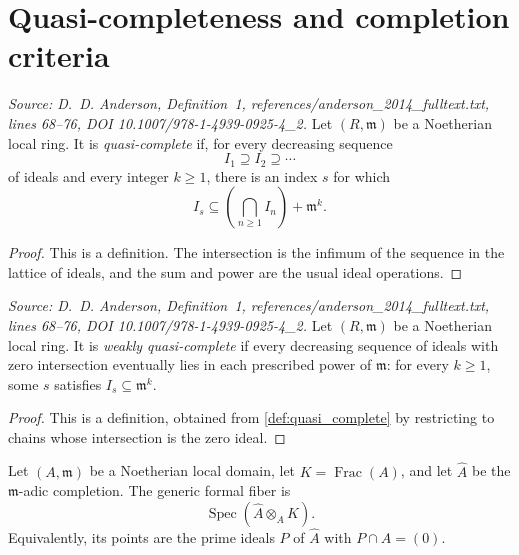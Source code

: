 \chapter{Quasi-completeness and completion criteria}

\begin{definition}
  \label{def:quasi_complete}
  \textit{Source: D.~D. Anderson, Definition~1,
  references/anderson\_2014\_fulltext.txt, lines 68--76,
  DOI 10.1007/978-1-4939-0925-4\_2.}
  Let \((R,\mathfrak m)\) be a Noetherian local ring.  It is
  \emph{quasi-complete} if, for every decreasing sequence
  \[
    I_1\supseteq I_2\supseteq\cdots
  \]
  of ideals and every integer \(k\geq 1\), there is an index \(s\) for which
  \[
    I_s\subseteq \left(\bigcap_{n\geq 1}I_n\right)+\mathfrak m^k.
  \]
\end{definition}

\begin{proof}
  This is a definition.  The intersection is the infimum of the sequence in
  the lattice of ideals, and the sum and power are the usual ideal operations.
\end{proof}

\begin{definition}
  \label{def:weakly_quasi_complete}
  \textit{Source: D.~D. Anderson, Definition~1,
  references/anderson\_2014\_fulltext.txt, lines 68--76,
  DOI 10.1007/978-1-4939-0925-4\_2.}
  Let \((R,\mathfrak m)\) be a Noetherian local ring.  It is \emph{weakly
  quasi-complete} if every decreasing sequence of ideals with zero
  intersection eventually lies in each prescribed power of \(\mathfrak m\):
  for every \(k\geq 1\), some \(s\) satisfies \(I_s\subseteq\mathfrak m^k\).
\end{definition}

\begin{proof}
  This is a definition, obtained from \cref{def:quasi_complete} by restricting
  to chains whose intersection is the zero ideal.
\end{proof}

\begin{definition}
  \label{def:generic_formal_fiber}
  Let \((A,\mathfrak m)\) be a Noetherian local domain, let
  \(K=\operatorname{Frac}(A)\), and let \(\widehat A\) be the
  \(\mathfrak m\)-adic completion.  The generic formal fiber is
  \[
    \operatorname{Spec}(\widehat A\otimes_A K).
  \]
  Equivalently, its points are the prime ideals \(P\) of \(\widehat A\) with
  \(P\cap A=(0)\).
\end{definition}

